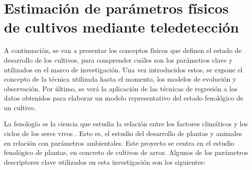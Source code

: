\section{Estimación de parámetros físicos de cultivos mediante teledetección}
\par A continuación, se van a presentar los conceptos físicos que definen el estado de desarrollo de los cultivos, para comprender cuáles son los parámetros clave y utilizados en el marco de investigación. Una vez introducidos estos, se expone el concepto de la técnica utilizada hasta el momento, los modelos de evolución y observación. Por último, se verá la aplicación de las técnicas de regresión a los datos obtenidos para elaborar un modelo representativo del estado fenológico de un cultivo.
\\
\par La fenología es la ciencia que estudia la relación entre los factores climáticos y los ciclos de los seres vivos \citep{feno}. Esto es, el estudio del desarrollo de plantas y animales en relación con parámetros ambientales. Este proyecto se centra en el estudio fenológico de plantas, en concreto de cultivos de arroz. Algunos de los parámetros descriptores clave utilizados en esta investigación son los siguientes: 
